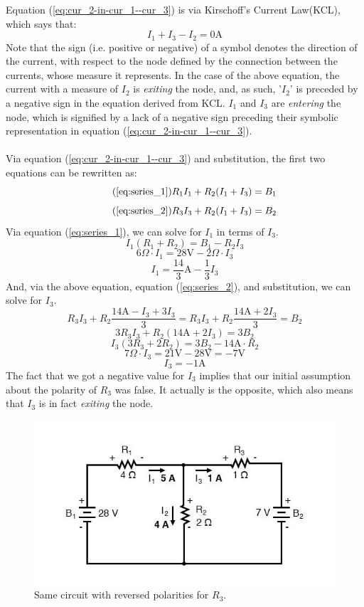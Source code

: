 \documentclass{article}
\begin{document}
	Equation (\ref{eq:cur_2-in-cur_1--cur_3}) is via Kirschoff's Current 
	Law(KCL), which says that:
	$$ I_1 + I_3 - I_2 = 0\text{A}$$
	Note that the sign (i.e. positive or negative) of a symbol denotes the 
	direction of the current, with respect to the node defined by the 
	connection between the currents, whose measure it represents.  In the case 
	of the above equation, the current with a measure of $I_2$ is 
	\emph{exiting} the node, and, as such, '$I_2$' is preceded by a negative 
	sign in the equation derived from KCL.   $I_1$ and $I_3$ are 
	\emph{entering} the node, which is signified by a lack of a negative sign 
	preceding their symbolic representation in equation 
	(\ref{eq:cur_2-in-cur_1--cur_3}).\\ \\
	Via equation (\ref{eq:cur_2-in-cur_1--cur_3}) and substitution, the first 
	two equations 
	can be rewritten as:
	\begin{equation}\tag{\ref{eq:series_1}}
		R_1I_1 + R_2(I_1 + I_3) = B_1
	\end{equation}
	\begin{equation}\tag{\ref{eq:series_2}}
		R_3I_3 + R_2(I_1 + I_3) = B_2
	\end{equation}
	Via equation (\ref{eq:series_1}), we can solve for $I_1$ in terms of $I_3$.
	$$ I_1(R_1 + R_2) = B_1 - R_2I_3$$
	$$ 6 \Omega \cdot I_1 = 28\text{V} - 2 \Omega \cdot I_3$$
	\begin{equation}\label{eq:cur_1-in-cur_3}
		I_1 = \frac{14}{3}\text{A} - \frac{1}{3}I_3
	\end{equation}
	And, via the above equation, equation (\ref{eq:series_2}), and 
	substitution, we can solve for $I_3$.
	$$ R_3I_3 + R_2 \frac{14\text{A}- I_3 + 3I_3}{3} = R_3I_3 + R_2 
	\frac{14\text{A} + 2I_3}{3} = B_2$$
	$$ 3R_3I_3 + R_2(14\text{A} + 2I_3) = 3B_2$$
	$$ I_3(3R_3 + 2R_2) = 3B_2 - 14\text{A} \cdot R_2$$
	$$ 7\Omega \cdot I_3 = 21\text{V} - 28\text{V} = -7\text{V}$$
	\begin{equation}\label{eq:cur_3}
		I_3 = -1\text{A}
	\end{equation}
	The fact that we got a negative value for $I_3$ implies that our initial 
	assumption about the polarity of $R_3$ was false.  It actually is the 
	opposite, which also means that $I_3$ is in fact \emph{exiting} the 
	node.
	\begin{figure}[H]\label{fig:circuit-2}
		\caption{Same circuit with reversed polarities for $R_3$.}
		\centering
		\includegraphics[width=0.75\linewidth,height=0.375\linewidth]{complex-2}
	\end{figure}
\end{document}
